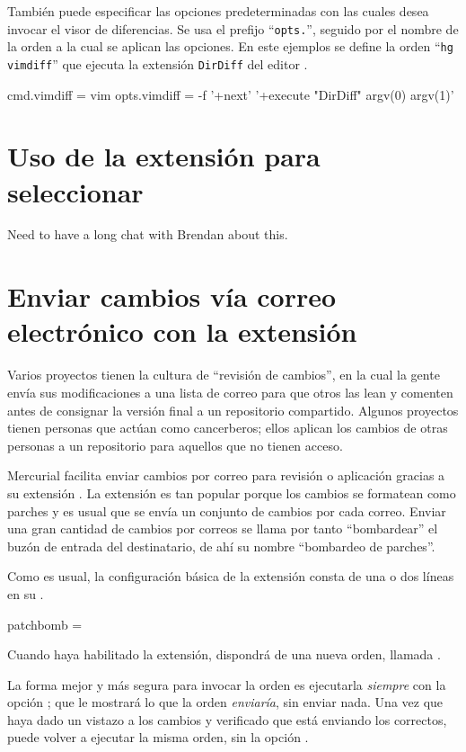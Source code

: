 También puede especificar las opciones predeterminadas con las cuales
desea invocar el visor de diferencias.  Se usa el prefijo ``\texttt{opts.}'',
seguido por el nombre de la orden a la cual se aplican las opciones.
En este ejemplos se define la orden ``\texttt{hg vimdiff}'' que
ejecuta la extensión \texttt{DirDiff} del editor .
\begin{codesample2}
  [extdiff]  
  cmd.vimdiff = vim
  opts.vimdiff = -f '+next' '+execute "DirDiff" argv(0) argv(1)'
\end{codesample2}

\section{Uso de la extensión  para seleccionar}
\label{sec:hgext:transplant}

Need to have a long chat with Brendan about this.

\section{Enviar cambios vía correo electrónico con la extensión }
\label{sec:hgext:patchbomb}

Varios proyectos tienen la cultura de ``revisión de cambios'', en la
cual la gente envía sus modificaciones a una lista de correo para que
otros las lean y comenten antes de consignar la versión final a un
repositorio compartido.  Algunos proyectos tienen personas que actúan
como cancerberos; ellos aplican los cambios de otras personas a un
repositorio para aquellos que no tienen acceso.

Mercurial facilita enviar cambios por correo para revisión o
aplicación gracias a su extensión .  La extensión es
tan popular porque los cambios se formatean como parches y es usual
que se envía un conjunto de cambios por cada correo.  Enviar una gran
cantidad de cambios por correos se llama por tanto ``bombardear'' el
buzón de entrada del destinatario, de ahí su nombre ``bombardeo de
parches''.

Como es usual, la configuración básica de la extensión
 consta de una o dos líneas en su \hgrc.
\begin{codesample2}
  [extensions]
  patchbomb =
\end{codesample2}
Cuando haya habilitado la extensión, dispondrá de una nueva orden,
llamada .

La forma mejor y más segura para invocar la orden
 es ejecutarla \emph{siempre} con la opción
; que le mostrará lo que la orden
\emph{enviaría}, sin enviar nada.  Una vez que haya dado un vistazo a
los cambios y verificado que está enviando los correctos, puede volver
a ejecutar la misma orden, sin la opción .

